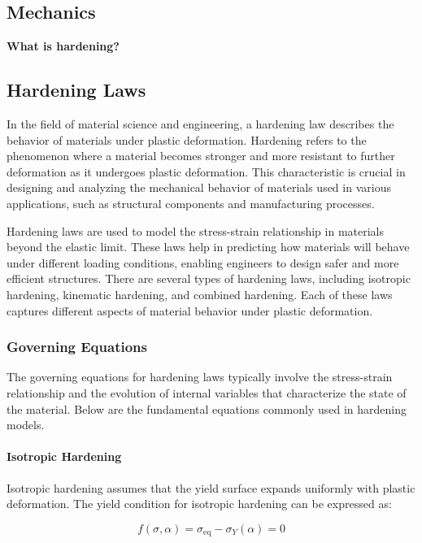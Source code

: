 \subsection{Mechanics}
\textbf{What is hardening?}\\
\subsection{Hardening Laws}

In the field of material science and engineering, a hardening law describes the behavior of materials under plastic deformation. Hardening refers to the phenomenon where a material becomes stronger and more resistant to further deformation as it undergoes plastic deformation. This characteristic is crucial in designing and analyzing the mechanical behavior of materials used in various applications, such as structural components and manufacturing processes.

Hardening laws are used to model the stress-strain relationship in materials beyond the elastic limit. These laws help in predicting how materials will behave under different loading conditions, enabling engineers to design safer and more efficient structures. There are several types of hardening laws, including isotropic hardening, kinematic hardening, and combined hardening. Each of these laws captures different aspects of material behavior under plastic deformation.

\subsubsection{Governing Equations}

The governing equations for hardening laws typically involve the stress-strain relationship and the evolution of internal variables that characterize the state of the material. Below are the fundamental equations commonly used in hardening models.

\paragraph{Isotropic Hardening}

Isotropic hardening assumes that the yield surface expands uniformly with plastic deformation. The yield condition for isotropic hardening can be expressed as:

\begin{equation}
f(\sigma, \alpha) = \sigma_{\text{eq}} - \sigma_Y(\alpha) = 0
\end{equation}

